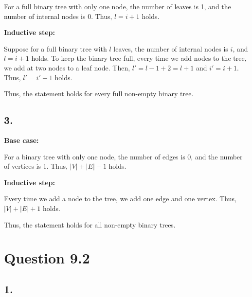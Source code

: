 \documentclass[a4paper,12pt]{article}
\begin{document}
For a full binary tree with only one node, the number of leaves is 1, and the number of internal nodes is 0.
Thus, $l = i + 1$ holds.

\textbf{Inductive step:}

Suppose for a full binary tree with $l$ leaves, the number of internal nodes is $i$, and $l = i + 1$ holds.
To keep the binary tree full, every time we add nodes to the tree, we add at two nodes to a leaf node.
Then, $l' = l - 1 + 2 = l + 1$ and $i' = i + 1$.
Thus, $l' = i' + 1$ holds.

Thus, the statement holds for every full non-empty binary tree.

\subsection*{3.}

\textbf{Base case:}

For a binary tree with only one node, the number of edges is 0, and the number of vertices is 1.
Thus, $|V| + |E| + 1$ holds.

\textbf{Inductive step:}

Every time we add a node to the tree, we add one edge and one vertex.
Thus, $|V| + |E| + 1$ holds.

Thus, the statement holds for all non-empty binary trees.

\section*{Question 9.2}

\subsection*{1.}

\begin{center}
\end{center}
\end{document}

